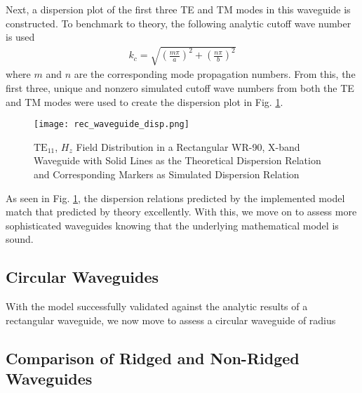 Next, a dispersion plot of the first three TE and TM modes in this waveguide is constructed. To benchmark to theory, the following analytic cutoff wave number is used
\begin{align}
    k_c=\sqrt{\left(\frac{m\pi}{a}\right)^2+\left(\frac{n\pi}{b}\right)^2}
\end{align}
where $m$ and $n$ are the corresponding mode propagation numbers. From this, the first three, unique and nonzero simulated cutoff wave numbers from both the TE and TM modes were used to create the dispersion plot in Fig. \ref{fig:rect_disp}.

\begin{figure}[h!]  
	\centering
	\texttt{[image: rec\_waveguide\_disp.png]} 
	\caption{$\mathrm{TE_{11}}$, $H_z$ Field Distribution in a Rectangular WR-90, X-band Waveguide with Solid Lines as the Theoretical Dispersion Relation and Corresponding Markers as Simulated Dispersion Relation}
	\label{fig:rect_disp}
\end{figure}

As seen in Fig. \ref{fig:rect_disp}, the dispersion relations predicted by the implemented model match that predicted by theory excellently. With this, we move on to assess more sophisticated waveguides knowing that the underlying mathematical model is sound.


\subsection{Circular Waveguides}
\label{subsec:circ_guides}
With the model successfully validated against the analytic results of a rectangular waveguide, we now move to assess a circular waveguide of radius 

\subsection{Comparison of Ridged and Non-Ridged Waveguides}
\label{subsec:rid_guides}
